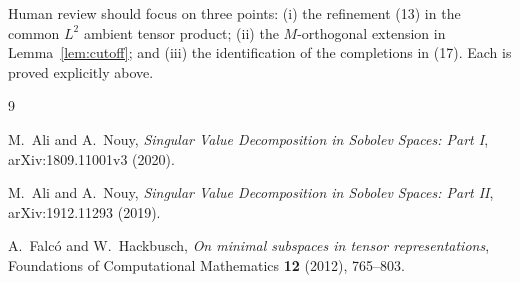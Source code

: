 \documentclass[11pt]{article}
\begin{document}
Human review should focus on three points: (i) the refinement (13) in the
common $L^2$ ambient tensor product; (ii) the $M$-orthogonal extension in
Lemma~\ref{lem:cutoff}; and (iii) the identification of the completions in
(17).  Each is proved explicitly above.

\begin{thebibliography}{9}

M.~Ali and A.~Nouy,
\emph{Singular Value Decomposition in Sobolev Spaces: Part I},
arXiv:1809.11001v3 (2020).

M.~Ali and A.~Nouy,
\emph{Singular Value Decomposition in Sobolev Spaces: Part II},
arXiv:1912.11293 (2019).

A.~Falc\'o and W.~Hackbusch,
\emph{On minimal subspaces in tensor representations},
Foundations of Computational Mathematics \textbf{12} (2012), 765--803.

\end{thebibliography}
\end{document}

